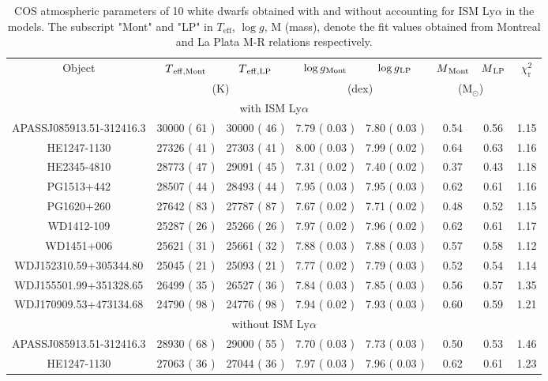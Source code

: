 \documentclass[fleqn,usenatbib, useAMS]{mnras}
\newcommand{\Teff}{\mbox{$T_{\mathrm{eff}}$}}
\newcommand{\logg}{\mbox{$\log g$}}
\begin{document}
\begin{table*}
\centering
\caption{COS atmospheric parameters of 10 white dwarfs obtained with and without accounting for ISM Ly$\alpha$ in the models. The subscript "Mont" and "LP" in \Teff, \logg, M (mass), denote the fit values obtained from Montreal and La Plata M-R relations respectively.}
\addtolength{\tabcolsep}{-1pt}
\begin{tabular}{cccccccc}
\hline
Object & $T\rm{_{eff,Mont}}$ & $T\rm{_{eff,LP}}$ & $\log g\rm{_{Mont}}$ & $\log g\rm{_{LP}}$  & $M\rm{_{Mont}}$ & $M\rm{_{LP}}$ & $\chi^{2}_\mathrm{r}$\\
& \multicolumn{2}{c}{(K)} & \multicolumn{2}{c}{(dex)}  & \multicolumn{2}{c}{(M$_\odot$)} \\
\hline
\multicolumn{8}{c}{with ISM Ly$\alpha$}\\\hline
APASSJ085913.51-312416.3	&	30000	(	61 	)	&	30000	(	46	)	&	7.79	(	0.03	)	&	7.80	(	0.03	)	&	0.54	&	0.56	&	1.15	\\
HE1247-1130	&	27326	(	41 	)	&	27303	(	41	)	&	8.00	(	0.03	)	&	7.99	(	0.02	)	&	0.64	&	0.63	&	1.16	\\
HE2345-4810	&	28773	(	47 	)	&	29091	(	45	)	&	7.31	(	0.02	)	&	7.40	(	0.02	)	&	0.37	&	0.43	&	1.18	\\
PG1513+442	&	28507	(	44 	)	&	28493	(	44	)	&	7.95	(	0.03	)	&	7.95	(	0.03	)	&	0.62	&	0.61	&	1.16	\\
PG1620+260	&	27642	(	83 	)	&	27787	(	87	)	&	7.67	(	0.02	)	&	7.71	(	0.02	)	&	0.48	&	0.52	&	1.15	\\
WD1412-109	&	25287	(	26 	)	&	25266	(	26	)	&	7.97	(	0.02	)	&	7.96	(	0.02	)	&	0.62	&	0.61	&	1.17	\\
WD1451+006	&	25621	(	31 	)	&	25661	(	32	)	&	7.88	(	0.03	)	&	7.88	(	0.03	)	&	0.57	&	0.58	&	1.12	\\
WDJ152310.59+305344.80	&	25045	(	21 	)	&	25093	(	21	)	&	7.77	(	0.02	)	&	7.79	(	0.03	)	&	0.52	&	0.54	&	1.14	\\
WDJ155501.99+351328.65	&	26499	(	35 	)	&	26527	(	36	)	&	7.84	(	0.03	)	&	7.85	(	0.03	)	&	0.56	&	0.57	&	1.35	\\
WDJ170909.53+473134.68	&	24790	(	98 	)	&	24776	(	98	)	&	7.94	(	0.02	)	&	7.93	(	0.03	)	&	0.60	&	0.59	&	1.21	\\\hline
\multicolumn{8}{c}{without ISM Ly$\alpha$}\\\hline
APASSJ085913.51-312416.3	&	28930	(	68 	)	&	29000	(	55	)	&	7.70	(	0.03	)	&	7.73	(	0.03	)	&	0.50	&	0.53	&	1.46	\\
HE1247-1130	&	27063	(	36 	)	&	27044	(	36	)	&	7.97	(	0.03	)	&	7.96	(	0.03	)	&	0.62	&	0.61	&	1.23	\\

\end{tabular}
\end{table*}
\end{document}
